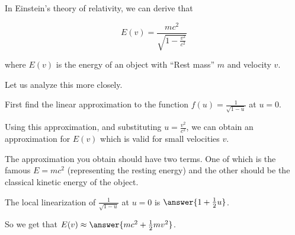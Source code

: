 \documentclass{ximera}
\author{Steven Gubkin}
\begin{document}
\begin{exercise}



In Einstein's theory of relativity, we can derive that

$$E(v) = \frac{mc^2}{\sqrt{1-\frac{v^2}{c^2}}}$$

where $E(v)$ is the energy of an object with ``Rest mass'' $m$ and velocity $v$.

Let us analyze this more closely.

First find the linear approximation to the function $f(u) = \frac{1}{\sqrt{1-u}}$ at $u=0$.

Using this approximation, and substituting $u = \frac{v^2}{c^2}$, we can obtain an approximation for $E(v)$ which is valid for small velocities $v$.

The approximation you obtain should have two terms.  One of which is the famous $E = mc^2$ (representing the resting energy) and the other should be the classical kinetic energy of the object.

\begin{prompt}
	The local linearization of $\frac{1}{\sqrt{1-u}}$ at $u=0$ is $\answer{1+\frac{1}{2}u}$.

	So we get that $E(v) \approx \answer{mc^2+\frac{1}{2}mv^2}$.
\end{prompt}

\end{exercise}
\end{document}
